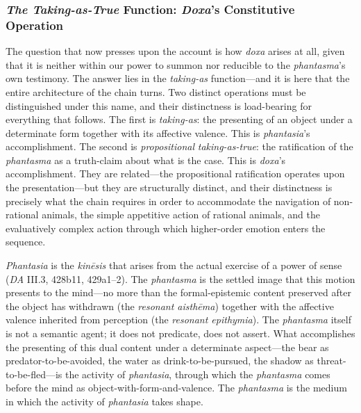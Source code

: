 \subsubsection*{\textit{The Taking-as-True} Function: \textit{Doxa}'s Constitutive Operation}

The question that now presses upon the account is how \textit{doxa} arises at all, given that it is neither within our power to summon nor reducible to the \textit{phantasma}'s own testimony. The answer lies in the \textit{taking-as} function---and it is here that the entire architecture of the chain turns. Two distinct operations must be distinguished under this name, and their distinctness is load-bearing for everything that follows. The first is \textit{taking-as}: the presenting of an object under a determinate form together with its affective valence. This is \textit{phantasia}'s accomplishment. The second is \textit{propositional} \textit{taking-as-true}: the ratification of the \textit{phantasma} as a truth-claim about what is the case. This is \textit{doxa}'s accomplishment. They are related---the propositional ratification operates upon the presentation---but they are structurally distinct, and their distinctness is precisely what the chain requires in order to accommodate the navigation of non-rational animals, the simple appetitive action of rational animals, and the evaluatively complex action through which higher-order emotion enters the sequence.

\textit{Phantasia} is the \textit{kinēsis} that arises from the actual exercise of a power of sense (\textit{DA} III.3, 428b11, 429a1--2). The \textit{phantasma} is the settled image that this motion presents to the mind---no more than the formal-epistemic content preserved after the object has withdrawn (the \textit{resonant aisthēma}) together with the affective valence inherited from perception (the \textit{resonant epithymia}). The \textit{phantasma} itself is not a semantic agent; it does not predicate, does not assert. What accomplishes the presenting of this dual content under a determinate aspect---the bear as predator-to-be-avoided, the water as drink-to-be-pursued, the shadow as threat-to-be-fled---is the activity of \textit{phantasia}, through which the \textit{phantasma} comes before the mind as object-with-form-and-valence. The \textit{phantasma} is the medium in which the activity of \textit{phantasia} takes shape.

